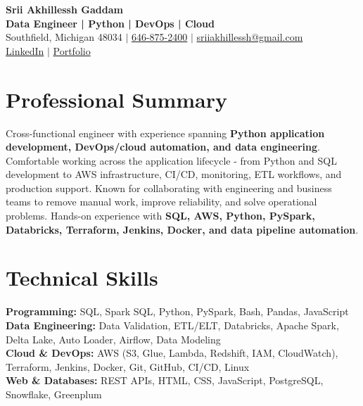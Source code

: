 \documentclass[letterpaper,10pt]{article}
\begin{document}
\fontsize{9.35pt}{10.45pt}\selectfont

\begin{center}
    {\LARGE \textbf{Srii Akhillessh Gaddam}} \\[-1pt]
    \textbf{Data Engineer | Python | DevOps | Cloud} \\[2pt]
    Southfield, Michigan 48034 $|$
    \href{tel:6468752400}{646-875-2400} $|$
    \href{mailto:sriiakhillessh@gmail.com}{sriiakhillessh@gmail.com} \\[1pt]
    \href{https://www.linkedin.com/in/srii-akhiilessh-gaddam-b48668191/}{LinkedIn} $|$
    \href{https://sriiakhillesshg.github.io/portfolio/}{Portfolio}
\end{center}
\vspace{-8pt}

\section{Professional Summary}
\small{Cross-functional engineer with experience spanning \textbf{Python application development, DevOps/cloud automation, and data engineering}. Comfortable working across the application lifecycle - from Python and SQL development to AWS infrastructure, CI/CD, monitoring, ETL workflows, and production support. Known for collaborating with engineering and business teams to remove manual work, improve reliability, and solve operational problems. Hands-on experience with \textbf{SQL, AWS, Python, PySpark, Databricks, Terraform, Jenkins, Docker, and data pipeline automation}.}

\section{Technical Skills}
\small{
\textbf{Programming:} SQL, Spark SQL, Python, PySpark, Bash, Pandas, JavaScript \\
\textbf{Data Engineering:} Data Validation, ETL/ELT, Databricks, Apache Spark, Delta Lake, Auto Loader, Airflow, Data Modeling \\
\textbf{Cloud \& DevOps:} AWS (S3, Glue, Lambda, Redshift, IAM, CloudWatch), Terraform, Jenkins, Docker, Git, GitHub, CI/CD, Linux \\
\textbf{Web \& Databases:} REST APIs, HTML, CSS, JavaScript, PostgreSQL, Snowflake, Greenplum
}

\end{document}
